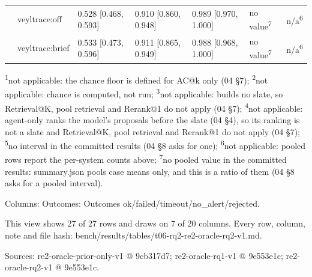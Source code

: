 \begin{table}[t]
\begin{tabular}{@{}lllllll@{}}
 & veyltrace:off & 0.528 [0.468, 0.593] & 0.910 [0.860, 0.948] & 0.989 [0.970, 1.000] & no value\textsuperscript{7} & n/a\textsuperscript{6} \\
 & veyltrace:brief & 0.533 [0.473, 0.596] & 0.911 [0.865, 0.949] & 0.988 [0.968, 1.000] & no value\textsuperscript{7} & n/a\textsuperscript{6} \\
\hline
\end{tabular}
\par\smallskip\scriptsize\raggedright
\textsuperscript{1}not applicable: the chance floor is defined for AC@k only (04 \S{}7); \textsuperscript{2}not applicable: chance is computed, not run; \textsuperscript{3}not applicable: builds no slate, so Retrieval@K, pool retrieval and Rerank@1 do not apply (04 \S{}7); \textsuperscript{4}not applicable: agent-only ranks the model's proposals before the slate (04 \S{}4), so its ranking is not a slate and Retrieval@K, pool retrieval and Rerank@1 do not apply (04 \S{}7); \textsuperscript{5}no interval in the committed results (04 \S{}8 asks for one); \textsuperscript{6}not applicable: pooled rows report the per-system counts above; \textsuperscript{7}no pooled value in the committed results: summary.json pools case means only, and this is a ratio of them (04 \S{}8 asks for a pooled interval).\par
Columns: Outcomes: Outcomes ok/\allowbreak{}failed/\allowbreak{}timeout/\allowbreak{}no\_alert/\allowbreak{}rejected.\par
This view shows 27 of 27 rows and draws on 7 of 20 columns. Every row, column, note and file hash: bench/\allowbreak{}results/\allowbreak{}tables/\allowbreak{}t06-rq2-re2-oracle-rq2-v1.md.\par
Sources: re2-oracle-prior-only-v1 @ 9cb317d7; re2-oracle-rq1-v1 @ 9e553e1c; re2-oracle-rq2-v1 @ 9e553e1c.\par
\end{table}
